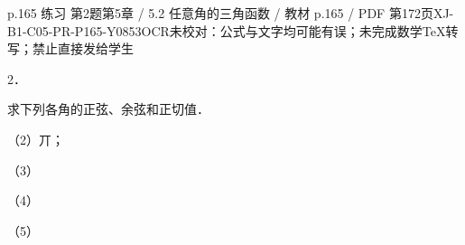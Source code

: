 \begin{bankitem}{p.165 练习 第2题}{第5章 / 5.2 任意角的三角函数 / 教材 p.165 / PDF 第172页}{XJ-B1-C05-PR-P165-Y0853}{OCR未校对：公式与文字均可能有误；未完成数学TeX转写；禁止直接发给学生}
\begin{ocrdraft}
\par
2．
\par
求下列各角的正弦、余弦和正切值．
\par
（2）丌；
\par
（3）
\par
（4）
\par
（5）
\end{ocrdraft}
\end{bankitem}
